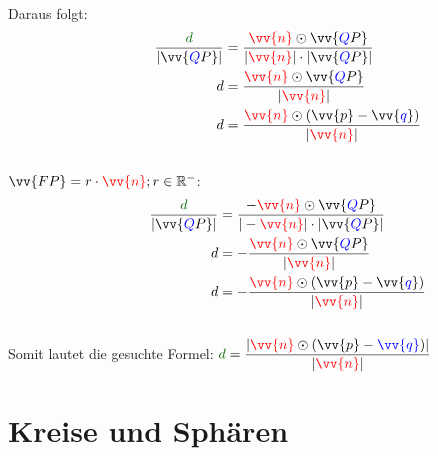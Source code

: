 \begin{Beweis}
            \paragraph{} Daraus folgt:
            \begin{align*}
                \qquad \qquad \dfrac{\textcolor{gree}{d}}{|\vv{\textcolor{blue}{Q}P}|} &= \dfrac{\textcolor{red}{\vv{n}} \odot \vv{\textcolor{blue}{Q}P}}{|\textcolor{red}{\vv{n}}| \cdot |\vv{\textcolor{blue}{Q}P}|} \\
                                                                                     d &= \dfrac{\textcolor{red}{\vv{n}} \odot \vv{\textcolor{blue}{Q}P}}{|\textcolor{red}{\vv{n}}|} \\
                                                                                     d &= \dfrac{\textcolor{red}{\vv{n}} \odot (\vv{p} - \vv{\textcolor{blue}{q}})}{|\textcolor{red}{\vv{n}}|} \\
            \end{align*}
            \\
            \underline{$\vv{FP} = r \cdot \textcolor{red}{\vv{n}} ; r \in \R^{-}$}:
            \begin{align*}
                \qquad \qquad \dfrac{\textcolor{gree}{d}}{|\vv{\textcolor{blue}{Q}P}|} &= \dfrac{-\textcolor{red}{\vv{n}} \odot \vv{\textcolor{blue}{Q}P}}{|-\textcolor{red}{\vv{n}}| \cdot |\vv{\textcolor{blue}{Q}P}|} \\
                                                                                     d &= -\dfrac{\textcolor{red}{\vv{n}} \odot \vv{\textcolor{blue}{Q}P}}{|\textcolor{red}{\vv{n}}|} \\
                                                                                     d &= -\dfrac{\textcolor{red}{\vv{n}} \odot (\vv{p} - \vv{\textcolor{blue}{q}})}{|\textcolor{red}{\vv{n}}|} \\
            \end{align*}
            \\
            Somit lautet die gesuchte Formel: $\textcolor{gree}{d} = \dfrac{|\textcolor{red}{\vv{n}} \odot (\vv{p} - \textcolor{blue}{\vv{q}})|}{|\textcolor{red}{\vv{n}}|}$
        \end{Beweis}




\section{Kreise und Sphären}

